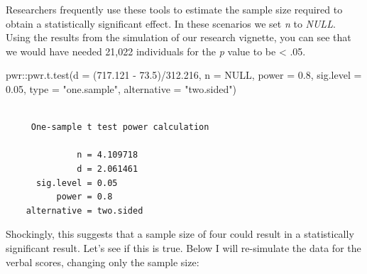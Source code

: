 \documentclass[
  11pt,
]{book}
\newenvironment{Shaded}{\begin{snugshade}}{\end{snugshade}}
\newcommand{\AttributeTok}[1]{\textcolor[rgb]{0.77,0.63,0.00}{#1}}
\newcommand{\ConstantTok}[1]{\textcolor[rgb]{0.00,0.00,0.00}{#1}}
\newcommand{\FloatTok}[1]{\textcolor[rgb]{0.00,0.00,0.81}{#1}}
\newcommand{\FunctionTok}[1]{\textcolor[rgb]{0.00,0.00,0.00}{#1}}
\newcommand{\NormalTok}[1]{#1}
\newcommand{\SpecialCharTok}[1]{\textcolor[rgb]{0.00,0.00,0.00}{#1}}
\newcommand{\StringTok}[1]{\textcolor[rgb]{0.31,0.60,0.02}{#1}}
\begin{document}
Researchers frequently use these tools to estimate the sample size required to obtain a statistically significant effect. In these scenarios we set \emph{n} to \emph{NULL}. Using the results from the simulation of our research vignette, you can see that we would have needed 21,022 individuals for the \emph{p} value to be \textless{} .05.

\begin{Shaded}
\begin{Highlighting}[]
\NormalTok{pwr}\SpecialCharTok{::}\FunctionTok{pwr.t.test}\NormalTok{(}\AttributeTok{d =}\NormalTok{ (}\FloatTok{717.121} \SpecialCharTok{{-}} \FloatTok{73.5}\NormalTok{)}\SpecialCharTok{/}\FloatTok{312.216}\NormalTok{, }\AttributeTok{n =} \ConstantTok{NULL}\NormalTok{, }\AttributeTok{power =} \FloatTok{0.8}\NormalTok{, }\AttributeTok{sig.level =} \FloatTok{0.05}\NormalTok{,}
    \AttributeTok{type =} \StringTok{"one.sample"}\NormalTok{, }\AttributeTok{alternative =} \StringTok{"two.sided"}\NormalTok{)}
\end{Highlighting}
\end{Shaded}

\begin{verbatim}

     One-sample t test power calculation 

              n = 4.109718
              d = 2.061461
      sig.level = 0.05
          power = 0.8
    alternative = two.sided
\end{verbatim}

Shockingly, this suggests that a sample size of four could result in a statistically significant result. Let's see if this is true. Below I will re-simulate the data for the verbal scores, changing only the sample size:
\end{document}
